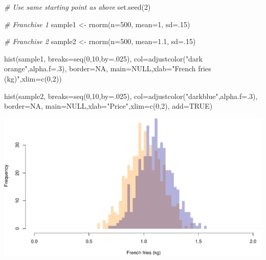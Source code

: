 \documentclass[
]{book}
\newenvironment{Shaded}{\begin{snugshade}}{\end{snugshade}}
\newcommand{\AttributeTok}[1]{\textcolor[rgb]{0.77,0.63,0.00}{#1}}
\newcommand{\CommentTok}[1]{\textcolor[rgb]{0.56,0.35,0.01}{\textit{#1}}}
\newcommand{\ConstantTok}[1]{\textcolor[rgb]{0.00,0.00,0.00}{#1}}
\newcommand{\DecValTok}[1]{\textcolor[rgb]{0.00,0.00,0.81}{#1}}
\newcommand{\FloatTok}[1]{\textcolor[rgb]{0.00,0.00,0.81}{#1}}
\newcommand{\FunctionTok}[1]{\textcolor[rgb]{0.00,0.00,0.00}{#1}}
\newcommand{\NormalTok}[1]{#1}
\newcommand{\OtherTok}[1]{\textcolor[rgb]{0.56,0.35,0.01}{#1}}
\newcommand{\StringTok}[1]{\textcolor[rgb]{0.31,0.60,0.02}{#1}}
\begin{document}
\begin{Shaded}
\begin{Highlighting}[]
\CommentTok{\# Use same starting point as above}
\FunctionTok{set.seed}\NormalTok{(}\DecValTok{2}\NormalTok{)}

\CommentTok{\# Franchise 1}
\NormalTok{sample1 }\OtherTok{\textless{}{-}} \FunctionTok{rnorm}\NormalTok{(}\AttributeTok{n=}\DecValTok{500}\NormalTok{, }\AttributeTok{mean=}\DecValTok{1}\NormalTok{, }\AttributeTok{sd=}\NormalTok{.}\DecValTok{15}\NormalTok{)}

\CommentTok{\# Franchise 2}
\NormalTok{sample2 }\OtherTok{\textless{}{-}} \FunctionTok{rnorm}\NormalTok{(}\AttributeTok{n=}\DecValTok{500}\NormalTok{, }\AttributeTok{mean=}\FloatTok{1.1}\NormalTok{, }\AttributeTok{sd=}\NormalTok{.}\DecValTok{15}\NormalTok{)}

\FunctionTok{hist}\NormalTok{(sample1,}
     \AttributeTok{breaks=}\FunctionTok{seq}\NormalTok{(}\DecValTok{0}\NormalTok{,}\DecValTok{10}\NormalTok{,}\AttributeTok{by=}\NormalTok{.}\DecValTok{025}\NormalTok{),}
     \AttributeTok{col=}\FunctionTok{adjustcolor}\NormalTok{(}\StringTok{"dark orange"}\NormalTok{,}\AttributeTok{alpha.f=}\NormalTok{.}\DecValTok{3}\NormalTok{),}
     \AttributeTok{border=}\ConstantTok{NA}\NormalTok{,}
     \AttributeTok{main=}\ConstantTok{NULL}\NormalTok{,}\AttributeTok{xlab=}\StringTok{"French fries (kg)"}\NormalTok{,}\AttributeTok{xlim=}\FunctionTok{c}\NormalTok{(}\DecValTok{0}\NormalTok{,}\DecValTok{2}\NormalTok{))}

\FunctionTok{hist}\NormalTok{(sample2,}
     \AttributeTok{breaks=}\FunctionTok{seq}\NormalTok{(}\DecValTok{0}\NormalTok{,}\DecValTok{10}\NormalTok{,}\AttributeTok{by=}\NormalTok{.}\DecValTok{025}\NormalTok{),}
     \AttributeTok{col=}\FunctionTok{adjustcolor}\NormalTok{(}\StringTok{"darkblue"}\NormalTok{,}\AttributeTok{alpha.f=}\NormalTok{.}\DecValTok{3}\NormalTok{),}
     \AttributeTok{border=}\ConstantTok{NA}\NormalTok{,}
     \AttributeTok{main=}\ConstantTok{NULL}\NormalTok{,}\AttributeTok{xlab=}\StringTok{"Price"}\NormalTok{,}\AttributeTok{xlim=}\FunctionTok{c}\NormalTok{(}\DecValTok{0}\NormalTok{,}\DecValTok{2}\NormalTok{),}
     \AttributeTok{add=}\ConstantTok{TRUE}\NormalTok{)}
\end{Highlighting}
\end{Shaded}

\includegraphics{figures/unnamed-chunk-230-1.pdf}
\end{document}
